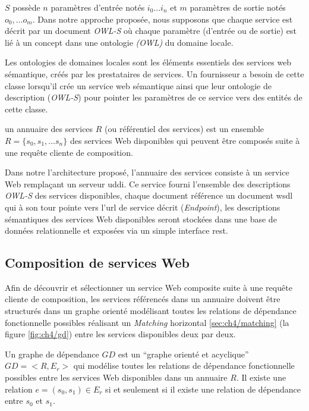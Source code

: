    $S$ possède $n$ paramètres d'entrée notés $i_0...i_n$ et $m$
   paramètres de sortie notés $o_0,...o_m$. Dans notre approche
   proposée, nous supposons que chaque service est décrit par un
   document \textit{OWL-S} où chaque paramètre (d'entrée ou de sortie)
   est lié à un concept dans une ontologie \textit{(OWL)} du domaine
   locale.\medskip


   Les ontologies de domaines locales sont les éléments essentiels des
   services web sémantique, créés par les prestataires de services. Un
   fournisseur a besoin de cette classe lorsqu'il crée un service web
   sémantique ainsi que leur ontologie de description (\textit{OWL-S})
   pour pointer les paramètres de ce service vers des entités de cette
   classe.

   \begin{mydef}
     un annuaire des services $R$ (ou référentiel des services) est un
     ensemble $R =\{s_0, s_1, ...s_n\}$ des services Web disponibles
     qui peuvent être composés suite à une requête cliente de
     composition.
  \end{mydef}

  Dans notre l'architecture proposé, l'annuaire des services consiste
  à un service Web remplaçant un serveur \acrshort{uddi}. Ce service
  fourni l'ensemble des descriptions \textit{OWL-S} des services
  disponibles, chaque document référence un document \acrshort{wsdl}
  qui à son tour pointe vers l'\acrshort{url} de service décrit
  (\textit{Endpoint}), les descriptions sémantiques des services Web
  disponibles seront stockées dans une base de données relationnelle
  et exposées via un simple interface \acrshort{rest}.\medskip

  

  \subsection{Composition de services Web}
  \label{sec:basic:composition}
  Afin de découvrir et sélectionner un service Web composite suite à
  une requête cliente de composition, les services référencés dans un
  annuaire doivent être structurés dans un graphe orienté modélisant
  toutes les relations de dépendance fonctionnelle possibles réalisant
  un \textit{Matching} horizontal \ref{sec:ch4/matching} (la figure
  \ref{fig:ch4/gd}) entre les services disponibles deux par
  deux.\medskip

  \begin{mydef}
    Un graphe de dépendance $GD$ est un ``graphe orienté et
    acyclique'' $GD=<R, E_r>$ qui modélise toutes les relations de
    dépendance fonctionnelle possibles entre les services Web
    disponibles dans un annuaire $R$. Il existe une relation $e=(s_0,
    s_1) \in E_r$ si et seulement si il existe une relation de
    dépendance entre $s_0$ et $s_1$.
  \end{mydef}

